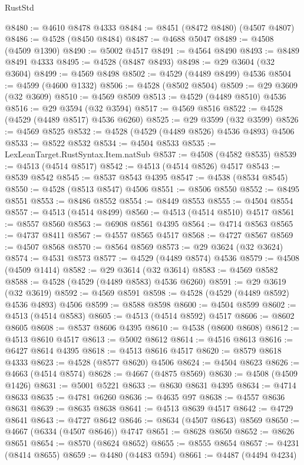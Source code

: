 \begin{lexlean}{RustStd}
\begin{coremodule}
@8480 := @4610 @8478 @4333
@8484 := @8451 (@8472 @8480) (@4507 @4807)
@8486 := @4528 (@8450 @8484)
@8487 := @4688 @5047
@8489 := @4508 (@4509 @1390)
@8490 := @5002 @4517
@8491 := @4564 @8490
@8493 := @8489 @8491 @4333
@8495 := @4528 (@8487 @8493)
@8498 := @29 @3604 (@32 @3604)
@8499 := @4569 @8498
@8502 := @4529 (@4489 @8499) @4536
@8504 := @4599 (@4600 @1332)
@8506 := @4528 (@8502 @8504)
@8509 := @29 @3609 (@32 @3609)
@8510 := @4569 @8509
@8513 := @4529 (@4489 @8510) @4536
@8516 := @29 @3594 (@32 @3594)
@8517 := @4569 @8516
@8522 := @4528 (@4529 (@4489 @8517) @4536 @6260)
@8525 := @29 @3599 (@32 @3599)
@8526 := @4569 @8525
@8532 := @4528 (@4529 (@4489 @8526) @4536 @4893) @4506
@8533 := @8522 @8532
@8534 := @4504 @8533
@8535 := LexLeanTarget.RustSyntax.Item.natSub
@8537 := @4508 (@4582 @8535)
@8539 := @4513 (@4514 @8517)
@8542 := @4513 (@4514 @8526) @4517
@8543 := @8539 @8542
@8545 := @8537 @8543 @4395
@8547 := @4538 (@8534 @8545)
@8550 := @4528 (@8513 @8547) @4506
@8551 := @8506 @8550
@8552 := @8495 @8551
@8553 := @8486 @8552
@8554 := @8449 @8553
@8555 := @4504 @8554
@8557 := @4513 (@4514 @8499)
@8560 := @4513 (@4514 @8510) @4517
@8561 := @8557 @8560
@8563 := @6908 @8561 @4395
@8564 := @4714 @8563
@8565 := @4737 @8411
@8567 := @4557 @8565 @4517
@8568 := @4727 @8567
@8569 := @4507 @8568
@8570 := @8564 @8569
@8573 := @29 @3624 (@32 @3624)
@8574 := @4531 @8573
@8577 := @4529 (@4489 @8574) @4536
@8579 := @4508 (@4509 @1414)
@8582 := @29 @3614 (@32 @3614)
@8583 := @4569 @8582
@8588 := @4528 (@4529 (@4489 @8583) @4536 @6260)
@8591 := @29 @3619 (@32 @3619)
@8592 := @4569 @8591
@8598 := @4528 (@4529 (@4489 @8592) @4536 @4893) @4506
@8599 := @8588 @8598
@8600 := @4504 @8599
@8602 := @4513 (@4514 @8583)
@8605 := @4513 (@4514 @8592) @4517
@8606 := @8602 @8605
@8608 := @8537 @8606 @4395
@8610 := @4538 (@8600 @8608)
@8612 := @4513 @8610 @4517
@8613 := @5002 @8612
@8614 := @4516 @8613
@8616 := @6427 @8614 @4395
@8618 := @4513 @8616 @4517
@8620 := @8579 @8618 @4333
@8623 := @4528 (@8577 @8620) @4506
@8624 := @4504 @8623
@8626 := @4663 (@4514 @8574)
@8628 := @4667 (@4875 @8569)
@8630 := @4508 (@4509 @1426)
@8631 := @5001 @5221
@8633 := @8630 @8631 @4395
@8634 := @4714 @8633
@8635 := @4781 @6260
@8636 := @4635 @97
@8638 := @4557 @8636 @8631
@8639 := @8635 @8638
@8641 := @4513 @8639 @4517
@8642 := @4729 @8641
@8643 := @4727 @8642
@8646 := @8634 (@4507 @8643) @8569
@8650 := @4667 (@6334 (@4507 @8646)) @4747
@8651 := @8628 @8650
@8652 := @8626 @8651
@8654 := @8570 (@8624 @8652)
@8655 := @8555 @8654
@8657 := @4231 (@8414 @8655)
@8659 := @4480 (@4483 @594)
@8661 := @4487 (@4494 @4234)

\end{coremodule}
\end{lexlean}

